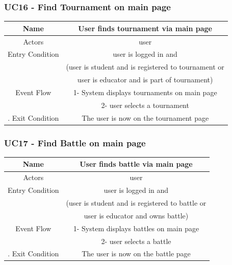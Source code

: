 \documentclass{article}
\begin{document}
\subsubsection*{UC16 - Find Tournament on main page}

\begin{tabular*}{\linewidth}{@{\extracolsep{\fill}} cc }
    \hline
    Name & User finds tournament via main page\\ 
    \hline
    Actors & user\\ 
    \hline
    Entry Condition & user is logged in and\\
                    & (user is student and is registered to tournament or\\ 
                    & user is educator and is part of tournament)\\
    \hline
    Event Flow & 1- System displays tournaments on main page\\
               & 2- user selects a tournament\\
    \hline.
    Exit Condition & The user is now on the tournament page\\
                
    \hline
\end{tabular*}

\subsubsection*{UC17 - Find Battle on main page}

\begin{tabular*}{\linewidth}{@{\extracolsep{\fill}} cc }
    \hline
    Name & User finds battle via main page\\ 
    \hline
    Actors & user\\ 
    \hline
    Entry Condition & user is logged in and\\
                    & (user is student and is registered to battle or\\ 
                    & user is educator and owns battle)\\
    \hline
    Event Flow & 1- System displays battles on main page\\
               & 2- user selects a battle\\
    \hline.
    Exit Condition & The user is now on the battle page\\
                
    \hline
\end{tabular*}
\end{document}
